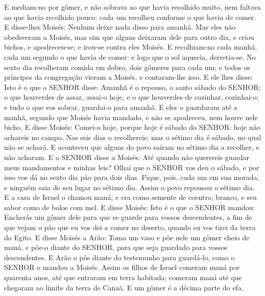 {E mediam-no por gômer, e não sobrava ao que havia recolhido muito, nem faltava ao que havia recolhido pouco: cada um recolheu conforme o que havia de comer.
E disse-lhes Moisés: Nenhum deixe nada disso para amanhã.
Mas eles não obedeceram a Moisés, mas sim que alguns deixaram dele para outro dia, e criou bichos, e apodreceu-se; e irou-se contra eles Moisés.
E recolhiam-no cada manhã, cada um segundo o que havia de comer: e logo que o sol aquecia, derretia-se.
No sexto dia recolheram comida em dobro, dois gômeres para cada um; e todos os príncipes da congregação vieram a Moisés, e contaram-lhe isso.
E ele lhes disse: Isto é o que o SENHOR disse: Amanhã é o repouso, o santo sábado do SENHOR; o que houverdes de assar, assai-o hoje, e o que houverdes de cozinhar, cozinhai-o; e tudo o que vos sobrar, guardai-o para amanhã.
E eles o guardaram até a manhã, segundo que Moisés havia mandado, e não se apodreceu, nem houve nele bicho.
E disse Moisés: Comei-o hoje, porque hoje é sábado do SENHOR: hoje não achareis no campo.
Nos seis dias o recolhereis; mas o sétimo dia é sábado, no qual não se achará.
E aconteceu que alguns do povo saíram no sétimo dia a recolher, e não acharam.
E o SENHOR disse a Moisés: Até quando não querereis guardar meus mandamentos e minhas leis?
Olhai que o SENHOR vos deu o sábado, e por isso vos dá no sexto dia pão para dois dias. Fique, pois, cada um em sua morada, e ninguém saia de seu lugar no sétimo dia.
Assim o povo repousou o sétimo dia.
E a casa de Israel o chamou maná; e era como semente de coentro, branco, e seu sabor como de bolos com mel.
E disse Moisés: Isto é o que o SENHOR mandou: Encherás um gômer dele para que se guarde para vossos descendentes, a fim de que vejam o pão que eu vos dei a comer no deserto, quando eu vos tirei da terra do Egito.
E disse Moisés a Arão: Toma um vaso e põe nele um gômer cheio de maná, e põe-o diante do SENHOR, para que seja guardado para vossos descendentes.
E Arão o pôs diante do testemunho para guardá-lo, como o SENHOR o mandou a Moisés.
Assim os filhos de Israel comeram maná por quarenta anos, até que entraram em terra habitada; comeram maná até que chegaram ao limite da terra de Canaã.
E um gômer é a décima parte do efa.

}
